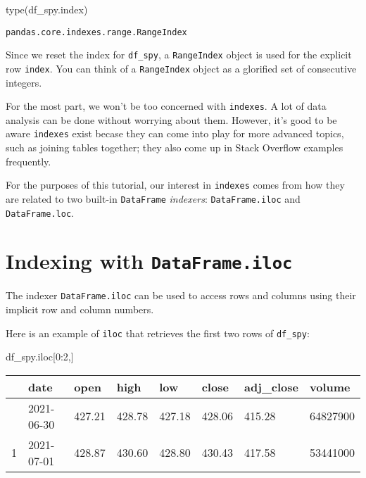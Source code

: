 \documentclass[
  letterpaper,
  DIV=11,
  numbers=noendperiod]{scrreprt}
\newenvironment{Shaded}{\begin{snugshade}}{\end{snugshade}}
\newcommand{\BuiltInTok}[1]{\textcolor[rgb]{0.00,0.23,0.31}{#1}}
\newcommand{\DecValTok}[1]{\textcolor[rgb]{0.68,0.00,0.00}{#1}}
\newcommand{\NormalTok}[1]{\textcolor[rgb]{0.00,0.23,0.31}{#1}}
\begin{document}
\begin{Shaded}
\begin{Highlighting}[]
\BuiltInTok{type}\NormalTok{(df\_spy.index)}
\end{Highlighting}
\end{Shaded}

\begin{verbatim}
pandas.core.indexes.range.RangeIndex
\end{verbatim}

Since we reset the index for \texttt{df\_spy}, a \texttt{RangeIndex}
object is used for the explicit row \texttt{index}. You can think of a
\texttt{RangeIndex} object as a glorified set of consecutive integers.

For the most part, we won't be too concerned with \texttt{indexes}. A
lot of data analysis can be done without worrying about them. However,
it's good to be aware \texttt{indexes} exist becase they can come into
play for more advanced topics, such as joining tables together; they
also come up in Stack Overflow examples frequently.

For the purposes of this tutorial, our interest in \texttt{indexes}
comes from how they are related to two built-in \texttt{DataFrame}
\emph{indexers}: \texttt{DataFrame.iloc} and \texttt{DataFrame.loc}.

\hypertarget{indexing-with-dataframe.iloc}{%
\section{\texorpdfstring{Indexing with
\texttt{DataFrame.iloc}}{Indexing with DataFrame.iloc}}\label{indexing-with-dataframe.iloc}}

The indexer \texttt{DataFrame.iloc} can be used to access rows and
columns using their implicit row and column numbers.

Here is an example of \texttt{iloc} that retrieves the first two rows of
\texttt{df\_spy}:

\begin{Shaded}
\begin{Highlighting}[]
\NormalTok{df\_spy.iloc[}\DecValTok{0}\NormalTok{:}\DecValTok{2}\NormalTok{,]}
\end{Highlighting}
\end{Shaded}

\begin{longtable}[]{@{}llllllll@{}}
\toprule\noalign{}
& date & open & high & low & close & adj\_close & volume \\
\midrule\noalign{}
\endhead
\bottomrule\noalign{}
\endlastfoot
0 & 2021-06-30 & 427.21 & 428.78 & 427.18 & 428.06 & 415.28 &
64827900 \\
1 & 2021-07-01 & 428.87 & 430.60 & 428.80 & 430.43 & 417.58 &
53441000 \\
\end{longtable}
\end{document}
